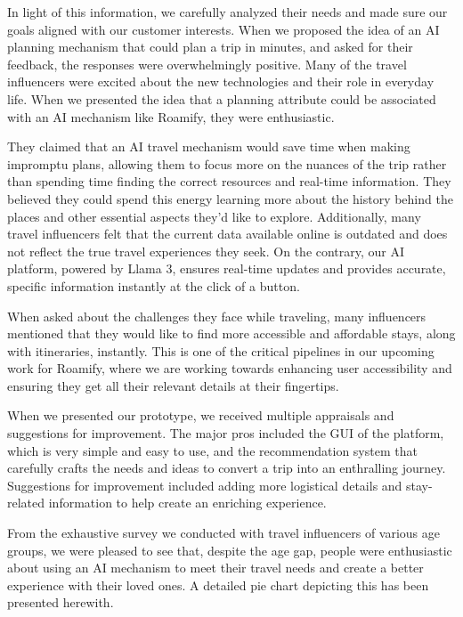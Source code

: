 \documentclass[sigconf,authordraft]{acmart}
\begin{document}
    In light of this information, we carefully analyzed their needs and made sure our goals aligned with our customer interests. When we proposed the idea of an AI planning mechanism that could plan a trip in minutes, and asked for their feedback, the responses were overwhelmingly positive. Many of the travel influencers were excited about the new technologies and their role in everyday life. When we presented the idea that a planning attribute could be associated with an AI mechanism like Roamify, they were enthusiastic.
    
    They claimed that an AI travel mechanism would save time when making impromptu plans, allowing them to focus more on the nuances of the trip rather than spending time finding the correct resources and real-time information. They believed they could spend this energy learning more about the history behind the places and other essential aspects they'd like to explore. Additionally, many travel influencers felt that the current data available online is outdated and does not reflect the true travel experiences they seek. On the contrary, our AI platform, powered by Llama 3, ensures real-time updates and provides accurate, specific information instantly at the click of a button.
    
    When asked about the challenges they face while traveling, many influencers mentioned that they would like to find more accessible and affordable stays, along with itineraries, instantly. This is one of the critical pipelines in our upcoming work for Roamify, where we are working towards enhancing user accessibility and ensuring they get all their relevant details at their fingertips.
    
    When we presented our prototype, we received multiple appraisals and suggestions for improvement. The major pros included the GUI of the platform, which is very simple and easy to use, and the recommendation system that carefully crafts the needs and ideas to convert a trip into an enthralling journey. Suggestions for improvement included adding more logistical details and stay-related information to help create an enriching experience.
    
    From the exhaustive survey we conducted with travel influencers of various age groups, we were pleased to see that, despite the age gap, people were enthusiastic about using an AI mechanism to meet their travel needs and create a better experience with their loved ones. A detailed pie chart depicting this has been presented herewith.
\end{document}
